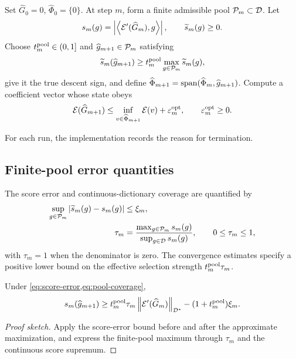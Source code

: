 \begin{algorithm}[htbp]
\caption{Finite-pool inexact CGA}
\label{alg:finite}
Set \(\widehat G_0=0\), \(\widehat\Phi_0=\{0\}\). At step \(m\), form a finite admissible pool
\(\mathcal{P}_m\subset\mathcal{D}\). Let
\[
 s_m(g)=\left|\left\langle \mathcal{E}'(\widehat G_m),g\right\rangle\right|,
 \qquad \widetilde s_m(g)\geq0.
\]
Choose \(t_m^{\rm pool}\in(0,1]\) and \(\widehat g_{m+1}\in\mathcal{P}_m\) satisfying
\[
 \widetilde s_m(\widehat g_{m+1})
 \geq t_m^{\rm pool}\max_{g\in\mathcal{P}_m}\widetilde s_m(g),
\]
give it the true descent sign, and define
\(\widehat\Phi_{m+1}=\operatorname{span}(\widehat\Phi_m,\widehat g_{m+1})\). Compute a coefficient vector whose state
obeys
\[
 \mathcal{E}(\widehat G_{m+1})
 \leq\inf_{v\in\widehat\Phi_{m+1}}\mathcal{E}(v)+\varepsilon_m^{\rm opt},
 \qquad \varepsilon_m^{\rm opt}\geq0.
\]
\end{algorithm}

For each run, the implementation records the reason for termination.

\subsection{Finite-pool error quantities}
\label{sec:controlled-selection}

The score error and continuous-dictionary coverage are quantified by
\begin{align}
 \sup_{g\in\mathcal{P}_m}\left|\widetilde s_m(g)-s_m(g)\right|&\leq\xi_m,
 \label{eq:score-error}\\
 \tau_m&=\frac{\max_{g\in\mathcal{P}_m}s_m(g)}{\sup_{g\in\mathcal{D}}s_m(g)},\qquad 0\leq\tau_m\leq1,
 \label{eq:pool-coverage}
\end{align}
with \(\tau_m=1\) when the denominator is zero. The convergence estimates specify a positive lower bound on the effective selection strength \(t_m^{\rm pool}\tau_m\).

\begin{lemma}
\label{lem:true-score}
Under \cref{eq:score-error,eq:pool-coverage},
\begin{equation}
 s_m(\widehat g_{m+1})\geq
 t_m^{\rm pool}\tau_m\left\lVert \mathcal{E}'(\widehat G_m)\right\rVert_{\mathcal{D}^*}
 -(1+t_m^{\rm pool})\xi_m.
\label{eq:true-score-lower}
\end{equation}
\end{lemma}

\begin{proof}[Proof sketch]
Apply the score-error bound before and after the approximate maximization, and express the finite-pool maximum through \(\tau_m\) and the continuous score supremum.
\end{proof}

